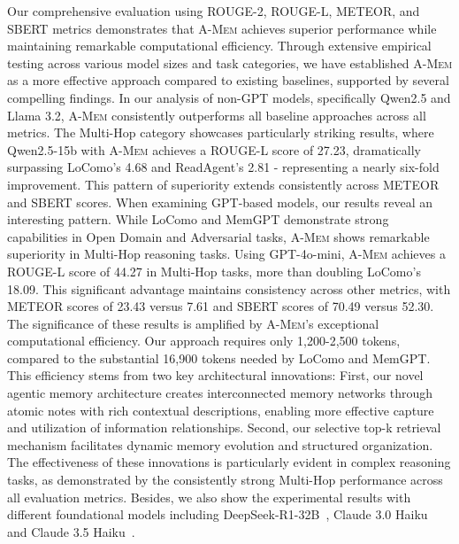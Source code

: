 \documentclass{article}
\newcommand{\ours}{\textsc{A-Mem}\xspace}
\begin{document}
Our comprehensive evaluation using ROUGE-2, ROUGE-L, METEOR, and SBERT metrics demonstrates that \ours achieves superior performance while maintaining remarkable computational efficiency. Through extensive empirical testing across various model sizes and task categories, we have established \ours as a more effective approach compared to existing baselines, supported by several compelling findings.
In our analysis of non-GPT models, specifically Qwen2.5 and Llama 3.2, \ours consistently outperforms all baseline approaches across all metrics. The Multi-Hop category showcases particularly striking results, where Qwen2.5-15b with \ours achieves a ROUGE-L score of 27.23, dramatically surpassing LoComo's 4.68 and ReadAgent's 2.81 - representing a nearly six-fold improvement. This pattern of superiority extends consistently across METEOR and SBERT scores.
When examining GPT-based models, our results reveal an interesting pattern. While LoComo and MemGPT demonstrate strong capabilities in Open Domain and Adversarial tasks, \ours shows remarkable superiority in Multi-Hop reasoning tasks. Using GPT-4o-mini, \ours achieves a ROUGE-L score of 44.27 in Multi-Hop tasks, more than doubling LoComo's 18.09. This significant advantage maintains consistency across other metrics, with METEOR scores of 23.43 versus 7.61 and SBERT scores of 70.49 versus 52.30.
The significance of these results is amplified by \ours's exceptional computational efficiency. Our approach requires only 1,200-2,500 tokens, compared to the substantial 16,900 tokens needed by LoComo and MemGPT. This efficiency stems from two key architectural innovations: First, our novel agentic memory architecture creates interconnected memory networks through atomic notes with rich contextual descriptions, enabling more effective capture and utilization of information relationships. Second, our selective top-k retrieval mechanism facilitates dynamic memory evolution and structured organization. The effectiveness of these innovations is particularly evident in complex reasoning tasks, as demonstrated by the consistently strong Multi-Hop performance across all evaluation metrics. Besides, we also show the experimental results with different foundational models including DeepSeek-R1-32B~\cite{guo2025deepseek}, Claude 3.0 Haiku~\cite{anthropic2024claude3} and Claude 3.5 Haiku~\cite{anthropic2025claude35}.
\end{document}
